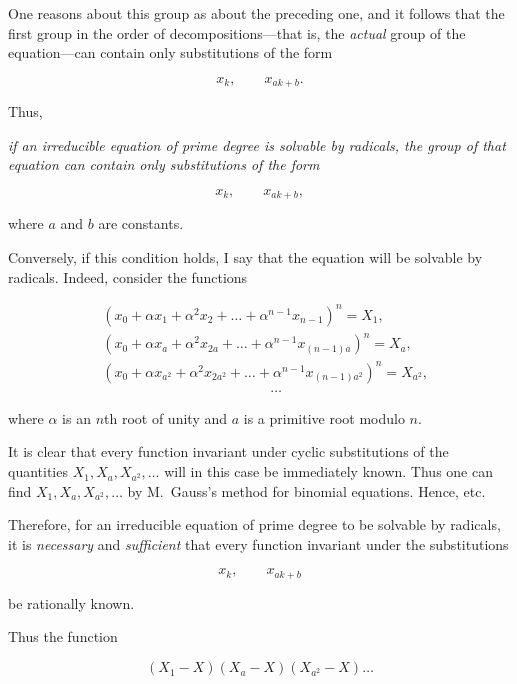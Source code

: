 One reasons about this group as about the preceding one, and it follows that the
first group in the order of decompositions---that is, the \emph{actual} group of
the equation---can contain only substitutions of the form

\[
x_{k},\qquad x_{ak+b}.
\]

Thus, {\itshape if an irreducible equation of prime degree is solvable by
radicals, the group of that equation can contain only substitutions of the form

\[
x_{k},\qquad x_{ak+b},
\]

where $a$ and $b$ are constants.}

Conversely, if this condition holds, I say that the equation will be solvable by
radicals. Indeed, consider the functions

\[
\begin{aligned}
&(x_{0}+\alpha x_{1}+\alpha^{2}x_{2}+\ldots+\alpha^{n-1}x_{n-1})^{n}=X_{1},\\
&(x_{0}+\alpha x_{a}+\alpha^{2}x_{2a}+\ldots+\alpha^{n-1}x_{(n-1)a})^{n}=X_{a},\\
&(x_{0}+\alpha x_{a^{2}}+\alpha^{2}x_{2a^{2}}+\ldots+\alpha^{n-1}x_{(n-1)a^{2}})^{n}=X_{a^{2}},\\
&\hspace{12em}\ldots
\end{aligned}
\]

where $\alpha$ is an $n$th root of unity and $a$ is a primitive root modulo $n$.

It is clear that every function invariant under cyclic substitutions of the
quantities $X_{1},X_{a},X_{a^{2}},\ldots$ will in this case be immediately known.
Thus one can find $X_{1},X_{a},X_{a^{2}},\ldots$ by M.~Gauss's method for
binomial equations. Hence, etc.

Therefore, for an irreducible equation of prime degree to be solvable by
radicals, it is \emph{necessary} and \emph{sufficient} that every function invariant
under the substitutions

\[
x_{k},\qquad x_{ak+b}
\]

be rationally known.

Thus the function

\[
(X_{1}-X)(X_{a}-X)(X_{a^{2}}-X)\ldots
\]

